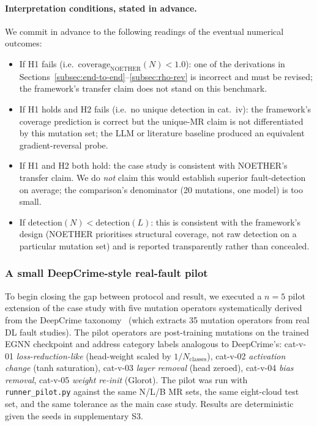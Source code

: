 \documentclass[acmsmall, screen]{acmart}
\begin{document}
\paragraph{Interpretation conditions, stated in advance.}
We commit in advance to the following readings of the eventual numerical outcomes:
\begin{itemize}
    \item If H1 fails (i.e.\ $\mathrm{coverage}_{\mathrm{NOETHER}}(N) < 1.0$): one of the derivations in Sections~\ref{subsec:end-to-end}--\ref{subsec:rho-rev} is incorrect and must be revised; the framework's transfer claim does not stand on this benchmark.
    \item If H1 holds and H2 fails (i.e.\ no unique detection in cat.~iv): the framework's coverage prediction is correct but the unique-MR claim is not differentiated by this mutation set; the LLM or literature baseline produced an equivalent gradient-reversal probe.
    \item If H1 and H2 both hold: the case study is consistent with NOETHER's transfer claim. We do \emph{not} claim this would establish superior fault-detection on average; the comparison's denominator (20 mutations, one model) is too small.
    \item If $\mathrm{detection}(N) < \mathrm{detection}(L)$: this is consistent with the framework's design (NOETHER prioritises structural coverage, not raw detection on a particular mutation set) and is reported transparently rather than concealed.
\end{itemize}

\subsubsection{A small DeepCrime-style real-fault pilot}
\label{subsec:deepcrime-pilot}

To begin closing the gap between protocol and result, we executed a $n=5$ pilot extension of the case study with five mutation operators systematically derived from the DeepCrime taxonomy~\cite{Humbatova2021DeepCrime} (which extracts 35 mutation operators from real DL fault studies). The pilot operators are post-training mutations on the trained EGNN checkpoint and address category labels analogous to DeepCrime's: cat-v-01 \emph{loss-reduction-like} (head-weight scaled by $1/N_{\text{classes}}$), cat-v-02 \emph{activation change} (tanh saturation), cat-v-03 \emph{layer removal} (head zeroed), cat-v-04 \emph{bias removal}, cat-v-05 \emph{weight re-init} (Glorot). The pilot was run with \texttt{runner\_pilot.py} against the same N/L/B MR sets, the same eight-cloud test set, and the same tolerance as the main case study. Results are deterministic given the seeds in supplementary S3.
\end{document}
